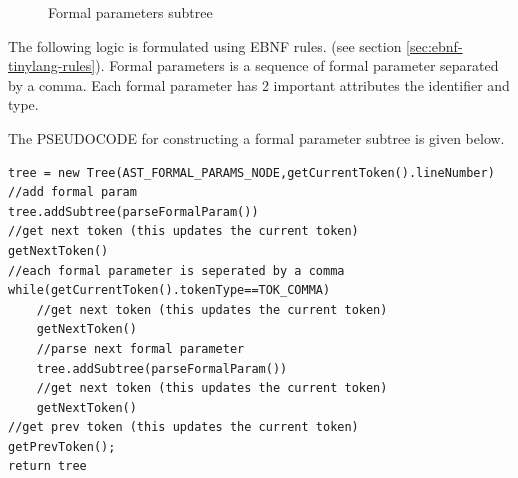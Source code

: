 \begin{figure}[H]
{
	}
	\caption{Formal parameters subtree}
	
	\label{fig:formal params subtree}
\end{figure}
The following logic is formulated using EBNF rules. (see section \ref{sec:ebnf-tinylang-rules}).
\vskip 0.1in    
Formal parameters is a sequence of formal parameter separated by a comma. Each formal parameter has 2 important attributes the identifier and type.
    
The PSEUDOCODE for constructing a formal parameter subtree is given below.
\begin{lstlisting}[caption=PSEUDOCODE for building a formal parameters subtree,label=listing:formal params subtree]
tree = new Tree(AST_FORMAL_PARAMS_NODE,getCurrentToken().lineNumber)
//add formal param
tree.addSubtree(parseFormalParam())
//get next token (this updates the current token)
getNextToken()
//each formal parameter is seperated by a comma
while(getCurrentToken().tokenType==TOK_COMMA)
    //get next token (this updates the current token)
    getNextToken() 
    //parse next formal parameter
    tree.addSubtree(parseFormalParam())
    //get next token (this updates the current token)
    getNextToken() 
//get prev token (this updates the current token)
getPrevToken();
return tree
\end{lstlisting}


